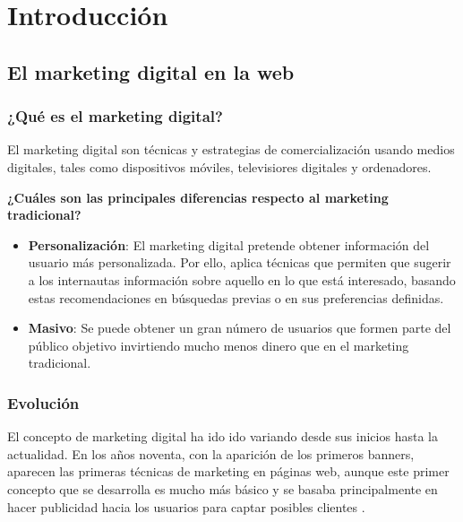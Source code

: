 \chapter{Introducción}


\section{El marketing digital en la web}


\subsection{¿Qué es el marketing digital?}

El marketing digital son técnicas y estrategias de comercialización usando medios digitales, tales como dispositivos móviles, televisiores digitales y ordenadores.

\vspace{5 mm}

\textbf{¿Cuáles son las principales diferencias respecto al marketing tradicional?}

\vspace{5 mm}

\begin{itemize}

\item \textbf{Personalización}: El marketing digital pretende obtener información del usuario más personalizada. Por ello, aplica técnicas que permiten que sugerir a los internautas información sobre aquello en lo que está interesado, basando estas recomendaciones en búsquedas previas o en sus preferencias definidas.

\item \textbf{Masivo}: Se puede obtener un gran número de usuarios que formen parte del público objetivo invirtiendo mucho menos dinero que en el marketing tradicional.


\end{itemize}

\subsection{Evolución}

El concepto de marketing digital ha ido ido variando desde sus inicios hasta la actualidad. En los años noventa, con la aparición de los primeros banners, aparecen las primeras técnicas de marketing en páginas web, aunque este primer concepto que se desarrolla es mucho más básico y se basaba principalmente en hacer publicidad hacia los usuarios para captar posibles clientes \cite{marketing-evolution}.

